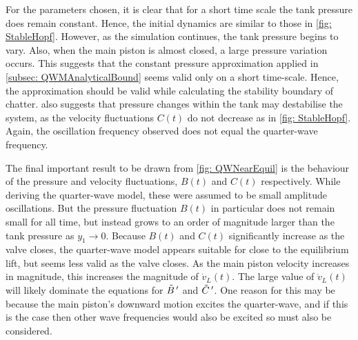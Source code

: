 For the parameters chosen, it is clear that for a short time scale the tank pressure does remain constant. Hence, the initial dynamics are similar to those in \cref{fig: StableHopf}. However, as the simulation continues, the tank pressure begins to vary. Also, when the main piston is almost closed, a large pressure variation occurs. This suggests that the constant pressure approximation applied in \cref{subsec: QWMAnalyticalBound} seems valid only on a short time-scale. Hence, the approximation should be valid while calculating the stability boundary of chatter.  also suggests that pressure changes within the tank may destabilise the system, as the velocity fluctuations $C(t)$ do not decrease as in \cref{fig: StableHopf}. Again, the oscillation frequency observed does not equal the quarter-wave frequency.

The final important result to be drawn from \cref{fig: QWNearEquil} is the behaviour of the pressure and velocity fluctuations, $B(t)$ and $C(t)$ respectively. While deriving the quarter-wave model, these were assumed to be small amplitude oscillations. But the pressure fluctuation $B(t)$ in particular does not remain small for all time, but instead grows to an order of magnitude larger than the tank pressure as $y_1 \rightarrow 0$.
Because $B(t)$ and $C(t)$ significantly increase as the valve closes, the quarter-wave model appears suitable for close to the equilibrium lift, but seems less valid as the valve closes. As the main piston velocity increases in magnitude, this increases the magnitude of $\dot{v}_L(t)$. The large value of $\dot{v}_L(t)$ will likely dominate the equations for $\tilde{B} \,{'}$ and $\tilde{C} \,{'}$. One reason for this may be because the main piston's downward motion excites the quarter-wave, and if this is the case then other wave frequencies would also be excited so must also be considered.